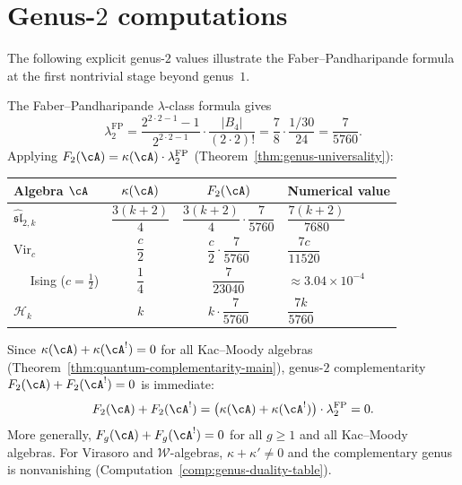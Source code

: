 \section{Genus-\texorpdfstring{$2$}{2} computations}
\label{sec:genus-2-computations}

The following explicit genus-$2$ values illustrate the Faber--Pandharipande formula at the first
nontrivial stage beyond genus~$1$.

\begin{computation}\label{comp:genus-2-values}
The Faber--Pandharipande $\lambda$-class formula gives
\begin{equation}\label{eq:lambda-2-value}
\lambda_2^{\mathrm{FP}}
 = \frac{2^{2 \cdot 2 - 1} - 1}{2^{2 \cdot 2 - 1}}
 \cdot \frac{|B_4|}{(2 \cdot 2)!}
 = \frac{7}{8} \cdot \frac{1/30}{24}
 = \frac{7}{5760}.
\end{equation}
Applying $F_2(\cA) = \kappa(\cA) \cdot \lambda_2^{\mathrm{FP}}$
\textup{(}Theorem~\textup{\ref{thm:genus-universality})}:
\begin{center}
\renewcommand{\arraystretch}{1.2}
\begin{tabular}{lccl}
\toprule
Algebra $\cA$ & $\kappa(\cA)$ & $F_2(\cA)$ & Numerical value \\
\midrule
$\widehat{\mathfrak{sl}}_{2,k}$
 & $\dfrac{3(k+2)}{4}$
 & $\dfrac{3(k+2)}{4} \cdot \dfrac{7}{5760}$
 & $\dfrac{7(k+2)}{7680}$ \\[6pt]
$\mathrm{Vir}_c$
 & $\dfrac{c}{2}$
 & $\dfrac{c}{2} \cdot \dfrac{7}{5760}$
 & $\dfrac{7c}{11520}$ \\[6pt]
$\quad$ Ising ($c = \tfrac{1}{2}$)
 & $\dfrac{1}{4}$
 & $\dfrac{7}{23040}$
 & $\approx 3.04 \times 10^{-4}$ \\[6pt]
$\mathcal{H}_k$
 & $k$
 & $k \cdot \dfrac{7}{5760}$
 & $\dfrac{7k}{5760}$ \\
\bottomrule
\end{tabular}
\end{center}
\end{computation}

\begin{remark}

\label{rem:genus-2-complementarity}
Since $\kappa(\cA) + \kappa(\cA^!) = 0$ for all Kac--Moody algebras
\textup{(}Theorem~\textup{\ref{thm:quantum-complementarity-main})},
genus-$2$ complementarity $F_2(\cA) + F_2(\cA^!) = 0$ is immediate:
\[
F_2(\cA) + F_2(\cA^!)
 = \bigl(\kappa(\cA) + \kappa(\cA^!)\bigr) \cdot \lambda_2^{\mathrm{FP}}
 = 0.
\]
More generally, $F_g(\cA) + F_g(\cA^!) = 0$ for all $g \geq 1$
and all Kac--Moody algebras. For Virasoro and $\mathcal{W}$-algebras,
$\kappa + \kappa' \neq 0$ and the complementary genus is nonvanishing
\textup{(}Computation~\textup{\ref{comp:genus-duality-table})}.
\end{remark}

